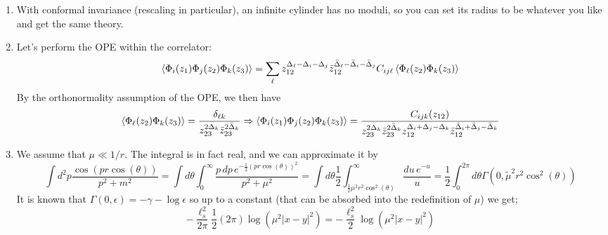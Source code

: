 \documentclass[11pt]{article}
\begin{document}
\begin{enumerate}
	 
	
%
	\item With conformal invariance (rescaling in particular), an infinite cylinder has no moduli, so you can set its radius to be whatever you like and get the same theory. 
	
	\item Let's perform the OPE within the correlator: 
	\[
		\braket{\Phi_i(z_1) \Phi_j(z_2) \Phi_k (z_3)} = \sum_{\ell} z_{12}^{\Delta_\ell - \Delta_i - \Delta_j} \bar z_{12}^{\bar \Delta_\ell - \bar \Delta_i - \bar \Delta_j} C_{ij\ell} \braket{ \Phi_{\ell}(z_2) \Phi_k(z_3)}
	\]
	By the orthonormality assumption of the OPE, we then have
	\[
	\braket{\Phi_\ell(z_2) \Phi_k (z_3)} = \frac{\delta_{\ell k}}{z_{23}^{2\Delta_k} \bar z_{23}^{2 \bar \Delta_k} }	\Rightarrow \braket{\Phi_i(z_1) \Phi_j(z_2) \Phi_k (z_3)} = \frac{C_{ijk} (z_{12})}{z_{23}^{2 \Delta_k} \bar z_{23}^{2 \bar \Delta_k} z_{12}^{\Delta_i+\Delta_j - \Delta_k} \bar z_{12}^{\bar \Delta_i+\bar \Delta_j - \bar \Delta_k} }
	\] 
	\item We assume that $\mu \ll 1/r$. The integral is in fact real, and we can approximate it by 
	\[
		\int d^2 p \frac{\cos(p r \cos(\theta))}{p^2 + m^2} = \int d\theta \int_0^\infty \frac{p\, dp\, e^{-\frac12 (p r \cos(\theta))^2}}{p^2 + \mu^2} = \int d\theta \frac12 \int_{\frac12 \mu^2 r^2 \cos^2(\theta)}^\infty \frac{du\, e^{-u}}{u} = \frac12 \int_{0}^{2\pi} d\theta \Gamma(0, \tilde \mu^2 r^2 \cos^2(\theta))
	\]
	It is known that $\Gamma(0, \epsilon) = -\gamma - \log \epsilon$ so up to a constant (that can be absorbed into the redefinition of $\mu$) we get;
	\[
		-\frac{\ell_s^2}{2\pi} \frac12 (2 \pi) \log(\mu^2 |x-y|^2) = - \frac{\ell_s^2}{2} \log(\mu^2 |x-y|^2)
	\]
	

\end{enumerate}
\end{document}
